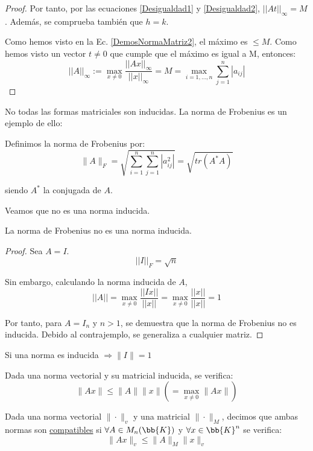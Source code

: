 \begin{prop}
\begin{proof}
        Por tanto, por las ecuaciones \ref{Desigualdad1} y \ref{Desigualdad2}, $||At||_\infty = M$. Además, se comprueba también que $h=k$.


        Como hemos visto en la Ec. \ref{DemosNormaMatriz2}, el máximo es $\leq M$. Como hemos visto un vector $t\neq 0$ que cumple que el máximo es igual a M, entonces:
        $$||A||_\infty :=  \max_{x\neq 0} \frac{||Ax||_\infty}{||x||_\infty} = M = \max_{i=1,\dots,n} \sum_{j=1}^n |a_{ij}|$$
        
    \end{proof}
\end{prop}

\bigskip
\noindent
No todas las formas matriciales son inducidas. La norma de Frobenius es un ejemplo de ello:
\begin{definicion}
    Definimos la norma de Frobenius por:
$$\|A\|_F = \sqrt{\sum_{i=1}^n\sum_{j=1}^n |a_{ij}^2|} = \sqrt{tr(A^\ast A)}$$

siendo $A^\ast$ la conjugada de $A$.
\end{definicion}

\noindent Veamos que no es una norma inducida.
\begin{lema}
    La norma de Frobenius no es una norma inducida.
\end{lema}
\begin{proof}
    Sea $A=I$. $$||I||_F=\sqrt{n}$$

    Sin embargo, calculando la norma inducida de $A$,
    \begin{equation*}
        ||A|| = \max_{x\neq 0} \frac{||Ix||}{||x||} = \max_{x\neq 0} \frac{||x||}{||x||} = 1
    \end{equation*}

    Por tanto, para $A=I_n$ y $n>1$, se demuestra que la norma de Frobenius no es inducida. Debido al contrajemplo, se generaliza a cualquier matriz.
\end{proof}

\begin{observacion}
    Si una norma es inducida $\Rightarrow \|I\|=1$
\end{observacion}

\begin{coro}
    Dada una norma vectorial y su matricial inducida, se verifica:
    $$\|Ax\| \leq \|A\|\|x\| (= \max_{x\neq 0}\|Ax\|)$$
\end{coro}

\begin{definicion}
    Dada una norma vectorial $\|\cdot\|_v$ y una matricial $\|\cdot\|_M$, decimos que ambas normas son \underline{compatibles}
    si $\forall A \in M_n(\bb{K})$ y $\forall x \in \bb{K}^n$ se verifica:
    $$\|Ax\|_v \leq \|A\|_M \|x\|_v$$
\end{definicion}

